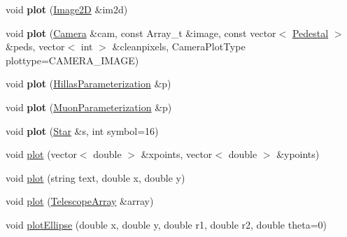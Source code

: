 \begin{DoxyCompactItemize}
\item 
\hypertarget{classPlotMaker_a5cd0467a97597f1a9ac7ff56c91e190a}{
void {\bfseries plot} (\hyperlink{classImage2D}{Image2D} \&im2d)}
\label{classPlotMaker_a5cd0467a97597f1a9ac7ff56c91e190a}

\item 
\hypertarget{classPlotMaker_a597669090c5147a8be97852df7bb3ea0}{
void {\bfseries plot} (\hyperlink{classCamera}{Camera} \&cam, const Array\_\-t \&image, const vector$<$ \hyperlink{structPedestal}{Pedestal} $>$ \&peds, vector$<$ int $>$ \&cleanpixels, CameraPlotType plottype=CAMERA\_\-IMAGE)}
\label{classPlotMaker_a597669090c5147a8be97852df7bb3ea0}

\item 
\hypertarget{classPlotMaker_adb38956252f687b85b2bda073004f2b9}{
void {\bfseries plot} (\hyperlink{structHillasParameterization}{HillasParameterization} \&p)}
\label{classPlotMaker_adb38956252f687b85b2bda073004f2b9}

\item 
\hypertarget{classPlotMaker_a58c7f9d496a48d042fe467cf4100275f}{
void {\bfseries plot} (\hyperlink{structMuonParameterization}{MuonParameterization} \&p)}
\label{classPlotMaker_a58c7f9d496a48d042fe467cf4100275f}

\item 
\hypertarget{classPlotMaker_a9c0c99af60541db38461620a9e2c185a}{
void {\bfseries plot} (\hyperlink{classStar}{Star} \&s, int symbol=16)}
\label{classPlotMaker_a9c0c99af60541db38461620a9e2c185a}

\item 
\hypertarget{classPlotMaker_acb86e21bc5d6326aac2d32d074c6dc8d}{
void \hyperlink{classPlotMaker_acb86e21bc5d6326aac2d32d074c6dc8d}{plot} (vector$<$ double $>$ \&xpoints, vector$<$ double $>$ \&ypoints)}
\label{classPlotMaker_acb86e21bc5d6326aac2d32d074c6dc8d}

\item 
\hypertarget{classPlotMaker_a0439c4f4f8961a93286f6daa6a9d29f3}{
void \hyperlink{classPlotMaker_a0439c4f4f8961a93286f6daa6a9d29f3}{plot} (string text, double x, double y)}
\label{classPlotMaker_a0439c4f4f8961a93286f6daa6a9d29f3}

\item 
\hypertarget{classPlotMaker_a43c25aca0a946c325994df24e38700ae}{
void \hyperlink{classPlotMaker_a43c25aca0a946c325994df24e38700ae}{plot} (\hyperlink{classTelescopeArray}{TelescopeArray} \&array)}
\label{classPlotMaker_a43c25aca0a946c325994df24e38700ae}

\item 
\hypertarget{classPlotMaker_a874f1d3b611200fa9b4bccb66262587e}{
void \hyperlink{classPlotMaker_a874f1d3b611200fa9b4bccb66262587e}{plotEllipse} (double x, double y, double r1, double r2, double theta=0)}
\label{classPlotMaker_a874f1d3b611200fa9b4bccb66262587e}


\end{DoxyCompactItemize}
